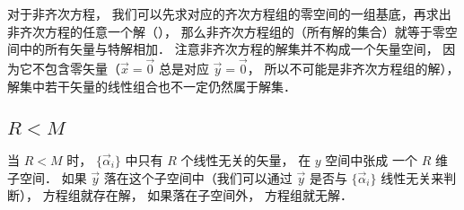 对于非齐次方程， 我们可以先求对应的齐次方程组的零空间的一组基底，再求出非齐次方程的任意一个解（）， 那么非齐次方程组的（所有解的集合）就等于零空间中的所有矢量与特解相加． 注意非齐次方程的解集并不构成一个矢量空间， 因为它不包含零矢量（$\vec x = \vec 0$ 总是对应 $\vec y = \vec 0$， 所以不可能是非齐次方程组的解），解集中若干矢量的线性组合也不一定仍然属于解集．

\subsection{$R < M$}
当 $R < M$ 时， $\{\vec \alpha_i\}$ 中只有 $R$ 个线性无关的矢量， 在 $y$ 空间中张成%
一个 $R$ 维子空间． 如果 $\vec y$ 落在这个子空间中（我们可以通过 $\vec y$ 是否与 $\{\vec \alpha_i\}$ 线性无关来判断）， 方程组就存在解， 如果落在子空间外， 方程组就无解．

